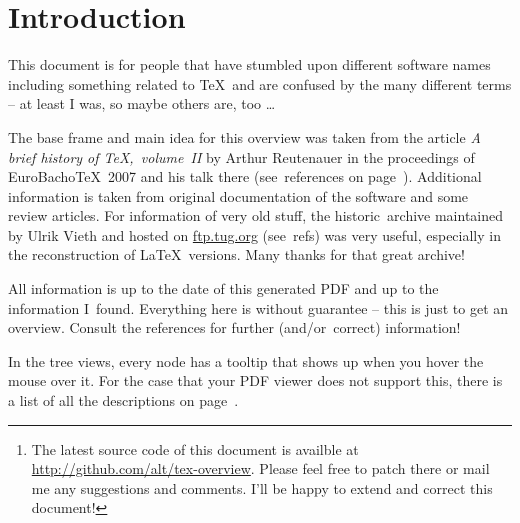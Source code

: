 


\begin{abstract}
In the world of \TeX, there are many developments and ambiguous names. This paper tries to give an overview of the development of \TeX\ and related programs. Contributions are very welcome!\footnote{The latest source code of this document is availble at \url{http://github.com/alt/tex-overview}. Please feel free to patch there or mail me any suggestions and comments. I'll be happy to extend and correct this document!}

{\centering \Large \hyperref[textextview]{Link for the impatient.}\\[2ex]}
\end{abstract}

\section*{Introduction}
This document is for people that have stumbled upon different software names including something related to \TeX\ and are confused by the many different terms – at least I was, so maybe others are, too … 

The base frame and main idea for this overview was taken from the article \textit{A brief history of \TeX,~volume~II} by Arthur Reutenauer in the proceedings of \textsf{EuroBacho\TeX~2007} and his talk there (see~references on page~\pageref{sec:refs}). Additional information is taken from original documentation of the software and some review articles. For information of very old stuff, the \textsf{historic~archive} maintained by Ulrik Vieth and hosted on \url{ftp.tug.org} (see~refs) was very useful, especially in the reconstruction of \LaTeX\ versions. Many thanks for that great archive!

All information is up to the date of this generated PDF and up to the information I~found. Everything here is without guarantee – this is just to get an overview. Consult the references for further (and/or~correct) information! 

In the tree views, every node has a tooltip that shows up when you hover the mouse over it. For the case that your PDF viewer does not support this, there is a list of all the descriptions on page~\pageref{sec:text}.


